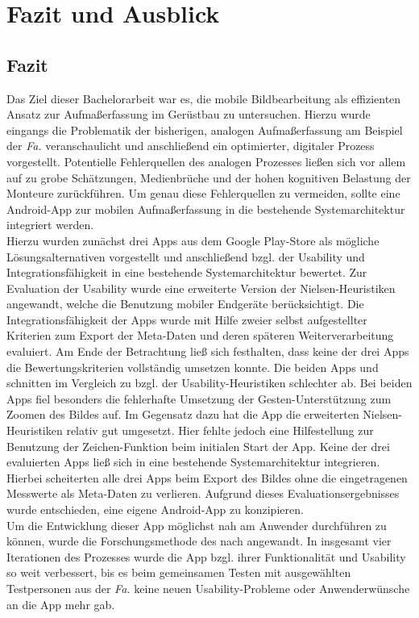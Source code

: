 \chapter{Fazit und Ausblick}
\section{Fazit}
Das Ziel dieser Bachelorarbeit war es, die mobile Bildbearbeitung als effizienten Ansatz zur Aufmaßerfassung im Gerüstbau zu untersuchen.
Hierzu wurde eingangs die Problematik der bisherigen, analogen Aufmaßerfassung am Beispiel der \emph{Fa.} \vr{} veranschaulicht und anschließend ein optimierter, digitaler Prozess vorgestellt.
Potentielle Fehlerquellen des analogen Prozesses ließen sich vor allem auf zu grobe Schätzungen, Medienbrüche und der hohen kognitiven Belastung der Monteure zurückführen.
Um genau diese Fehlerquellen zu vermeiden, sollte eine Android-App zur mobilen Aufmaßerfassung in die bestehende Systemarchitektur integriert werden. \\

Hierzu wurden zunächst drei Apps aus dem Google Play-Store als mögliche Lösungsalternativen vorgestellt und anschließend bzgl. der Usability und Integrationsfähigkeit in eine bestehende Systemarchitektur bewertet.
Zur Evaluation der Usability wurde eine erweiterte Version der Nielsen-Heuristiken angewandt, welche die Benutzung mobiler Endgeräte berücksichtigt.
Die Integrationsfähigkeit der Apps wurde mit Hilfe zweier selbst aufgestellter Kriterien zum Export der Meta-Daten und deren späteren Weiterverarbeitung evaluiert.
Am Ende der Betrachtung ließ sich festhalten, dass keine der drei Apps die Bewertungskriterien vollständig umsetzen konnte.
Die beiden Apps \mm{} und \pm{} schnitten im Vergleich zu \im{} bzgl. der Usability-Heuristiken schlechter ab.
Bei beiden Apps fiel besonders die fehlerhafte Umsetzung der Gesten-Unterstützung zum Zoomen des Bildes auf.
Im Gegensatz dazu hat die App \im{} die erweiterten Nielsen-Heuristiken relativ gut umgesetzt.
Hier fehlte jedoch eine Hilfestellung zur Benutzung der Zeichen-Funktion beim initialen Start der App.
Keine der drei evaluierten Apps ließ sich in eine bestehende Systemarchitektur integrieren.
Hierbei scheiterten alle drei Apps beim Export des Bildes ohne die eingetragenen Messwerte als Meta-Daten zu verlieren.
Aufgrund dieses Evaluationsergebnisses wurde entschieden, eine eigene Android-App zu konzipieren. \\

Um die Entwicklung dieser App möglichst nah am Anwender durchführen zu können, wurde die Forschungsmethode des \hcdp{} nach \citet{Norman13} angewandt.
In insgesamt vier Iterationen des Prozesses wurde die App bzgl. ihrer Funktionalität und Usability so weit verbessert, bis es beim gemeinsamen Testen mit ausgewählten Testpersonen aus der \emph{Fa.} \vr{} keine neuen Usability-Probleme oder Anwenderwünsche an die App mehr gab. \\

